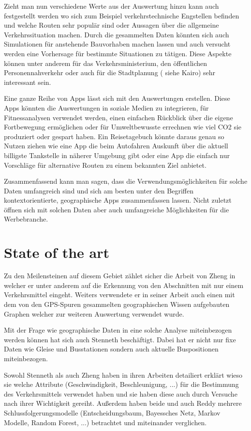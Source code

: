 Zieht man nun verschiedene Werte aus der Auswertung hinzu kann auch festgestellt werden wo sich zum Beispiel verkehrstechnische Engstellen befinden und welche Routen sehr populär sind oder Aussagen über die allgemeine Verkehrssituation machen. Durch die gesammelten Daten könnten sich auch Simulationen für anstehende Bauvorhaben machen lassen und auch versucht werden eine Vorhersage für bestimmte Situationen zu tätigen. Diese Aspekte können unter anderem für das Verkehrsministerium,  den öffentlichen Personennahverkehr oder auch für die Stadtplanung ( siehe Kairo) sehr interessant sein.

Eine ganze Reihe von Apps lässt sich mit den Auswertungen erstellen. Diese Apps könnten die Auswertungen in soziale Medien zu integrieren, für Fitnessanalysen verwendet werden, einen einfachen Rückblick über die eigene Fortbewegung ermöglichen oder für Umweltbewusste errechnen wie viel CO2 sie produziert oder gespart haben. Ein Reisetagebuch könnte daraus genau so Nutzen ziehen wie eine App die beim Autofahren Auskunft über die aktuell billigste Tankstelle in näherer Umgebung gibt oder eine App die einfach nur Vorschläge für alternative Routen zu einem bekannten Ziel anbietet.

Zusammenfassend kann man sagen, dass die Verwendungsmöglichkeiten für solche Daten umfangreich sind und sich am besten unter den Begriffen kontextorientierte, geographische Apps zusammenfassen lassen. Nicht zuletzt öffnen sich mit solchen Daten aber auch umfangreiche Möglichkeiten für die Werbebranche.

\section{State of the art}
Zu den Meilensteinen auf diesem Gebiet zählet sicher die Arbeit von Zheng in welcher er unter anderem auf die Erkennung von den Abschnitten mit nur einem Verkehrsmittel eingeht. Weiters verwendete er in seiner Arbeit auch einen mit dem von den GPS-Spuren gesammelten geographischen Wissen aufgebauten Graphen welcher zur weiteren Auswertung verwendet wurde.

Mit der Frage wie geographische Daten in eine solche Analyse miteinbezogen werden können hat sich auch  Stenneth beschäftigt. Dabei hat er nicht nur fixe Daten wie Gleise und Busstationen sondern auch aktuelle Buspositionen miteinbezogen. 

Sowohl Stenneth als auch Zheng haben in ihren Arbeiten detailiert erklärt wieso sie welche Attribute (Geschwindigkeit, Beschleunigung, ...) für die Bestimmung des Verkehrsmittels verwendet haben und sie haben diese auch durch Versuche nach ihrer Wichtigkeit gereiht. Außerdem haben beide und auch Reddy  mehrere Schlussfolgerungsmodelle (Entscheidungsbaum, Bayessches Netz, Markov Modelle, Random Forest, ...) betrachtet und miteinander verglichen.

